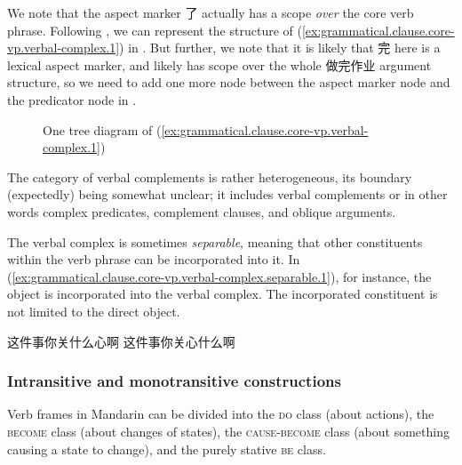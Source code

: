 \documentclass[UTF8, a4paper, oneside, scheme=plain, 12pt]{ctexrep}
\newcommand*{\category}[1]{\textsc{#1}}
\begin{document}
We note that the aspect marker 了 actually has a scope \emph{over} the core verb phrase.
Following ,
we can represent the structure of (\ref{ex:grammatical.clause.core-vp.verbal-complex.1})
in .
But further, we note that it is likely that 完 here is a lexical aspect marker,
and likely has scope over the whole 做完作业 argument structure,
so we need to add one more node between the aspect marker node
and the predicator node in .

\begin{figure}[H]
    \centering
    {
        \small
        
    }
    \caption{One tree diagram of (\ref{ex:grammatical.clause.core-vp.verbal-complex.1})}
    \label{fig:grammatical.clause.core-vp.verbal-complex.1.1}
\end{figure}

The category of verbal complements is rather heterogeneous,
its boundary (expectedly) being somewhat unclear;
it includes verbal complements or in other words complex predicates, 
complement clauses, 
and oblique arguments. 

The verbal complex is sometimes \emph{separable},
meaning that other constituents within the verb phrase can be incorporated into it.
In (\ref{ex:grammatical.clause.core-vp.verbal-complex.separable.1}),
for instance, the object is incorporated into the verbal complex.
The incorporated constituent is not limited to the direct object.

\begin{exe}
    \ex\label{ex:grammatical.clause.core-vp.verbal-complex.separable.1} \begin{xlist}
        \ex 这件事你关什么心啊
        \ex 这件事你关心什么啊
    \end{xlist}
\end{exe}
 

\subsubsection{Intransitive and monotransitive constructions}\label{sec:grammatical.clause.core-vp.transitivity}

Verb frames in Mandarin can be divided into the \category{do} class (about actions),
the \category{become} class (about changes of states),
the \category{cause}-\category{become} class (about something causing a state to change),
and the purely stative \category{be} class.
\end{document}

